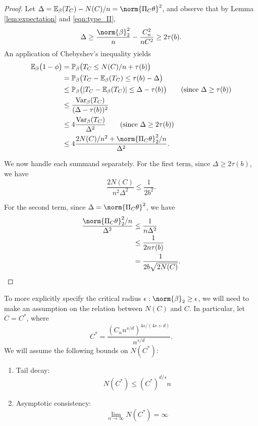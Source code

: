 \documentclass{article}
\newcommand{\abs}[1]{\left \lvert #1 \right \rvert}
\newcommand{\Var}{\mathrm{Var}}
\newcommand{\1}{\mathbb{I}}
\newcommand{\Pbb}{\mathbb{P}}
\newcommand{\Ebb}{\mathbb{E}}
\theoremstyle{alden}
\theoremstyle{aldenthm}
\theoremstyle{definition}
\theoremstyle{remark}
\begin{document}
\begin{proof}
	Let $\Delta = \Ebb_{\beta}(T_C) - N(C)/n = \norm{\Pi_C \theta}^2$, and observe that by Lemma \ref{lem:expectation} and \eqref{eqn:type_II},
	\begin{equation*}
	\Delta \geq \frac{\norm{\beta}_2^2}{n} - \frac{C_n^2}{nC^2} \geq 2 \tau(b).
	\end{equation*}
	An application of Chebyshev's inequality yields
	\begin{align*}
	\Ebb_{\beta}\bigl(1 - \phi\bigr) & = \Pbb_{\beta}\bigl(T_C \leq N(C)/n + \tau(b)\bigr) \\
	& = \Pbb_{\beta}\bigl(T_C - \Ebb_{\beta}(T_C) \leq \tau(b) - \Delta \bigr) \\
	& \leq \Pbb_{\beta}\bigl(\abs{T_C - \Ebb_{\beta}(T_C)} \leq \Delta - \tau(b) \bigr) \tag{since $\Delta \geq \tau(b)$}	\\
	& \leq \frac{\Var_{\beta}(T_C)}{(\Delta - \tau(b))^2} \\
	& \leq 4\frac{\Var_{\beta}(T_C)}{\Delta^2} \tag{since $\Delta \geq 2\tau(b)$} \\
	& \leq 4\frac{2N(C)/n^2 + \norm{\Pi_C\theta}_2^2/n}{\Delta^2}.
	\end{align*}
	
	We now handle each summand separately. For the first term, since $\Delta \geq 2 \tau(b)$, we have
	\begin{equation*}
	\frac{2N(C)}{n^2\Delta^2} \leq \frac{1}{2b^2}.
	\end{equation*}
	
	For the second term, since $\Delta = \norm{\Pi_C\theta}^2$, we have
	\begin{align*}
	\frac{\norm{\Pi_C\theta}_2^2/n}{\Delta^2} & \leq \frac{1}{n\Delta^2} \\
	& \leq \frac{1}{2n\tau(b)} \\
	& = \frac{1}{2b\sqrt{2N(C)}}.
	\end{align*}
\end{proof}

To more explicitly specify the critical radius $\epsilon: \norm{\beta}_2 \geq \epsilon$, we will need to make an assumption on the relation between $N(C)$ and $C$. In particular, let $C = C^*$, where
\begin{equation*}
C^* = \frac{(C_n n^{s/d})^{4s/(4s + d)}}{n^{s/d}}.
\end{equation*}
We will assume the following bounds on $N(C^*)$:
\begin{enumerate}[label=(A\arabic*)]
	\item Tail decay:
	\label{asmp:tail_decay}
	\begin{equation*}
	N(C^*) \leq (C^*)^{d/s}n
	\end{equation*}
	\item Asymptotic consistency:
	\label{asmp:asymp_consistency}
	\begin{equation*}
	\lim_{n \to \infty} N(C^*) = \infty
	\end{equation*}
\end{enumerate}
\end{document}
